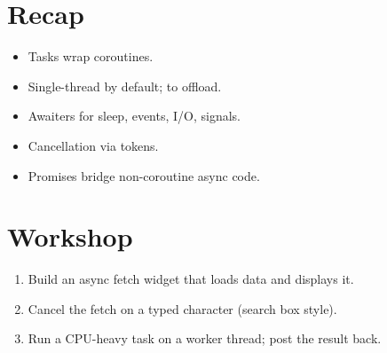 \section{Recap}

\begin{recap}
\begin{itemize}[leftmargin=*]
  \item Tasks wrap \cpp{} coroutines.
  \item Single-thread by default;  to
    offload.
  \item Awaiters for sleep, events, I/O, signals.
  \item Cancellation via tokens.
  \item Promises bridge non-coroutine async code.
\end{itemize}
\end{recap}

\section*{Workshop}

\begin{enumerate}[leftmargin=*]
  \item Build an async fetch widget that loads data and
    displays it.
  \item Cancel the fetch on a typed character (search box
    style).
  \item Run a CPU-heavy task on a worker thread; post the
    result back.
\end{enumerate}
